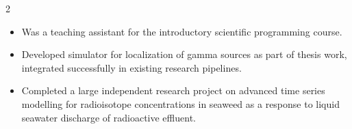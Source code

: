 \documentclass[10pt,a4paper,ragged2e,withhyper]{altacv}
\begin{document}
\begin{paracol}{2}
	


{\LaTeXraggedright
	\par}





\begin{itemize}
	\item Was a teaching assistant for the introductory scientific programming course.
	\item Developed simulator for localization of gamma sources as part of thesis work, integrated successfully in existing research pipelines.
	\item Completed a large independent research project on advanced time series modelling for radioisotope concentrations in seaweed as a response to liquid seawater discharge of radioactive effluent.
\end{itemize}

{\LaTeXraggedright
	\par}

\divider




\end{paracol}
\end{document}

